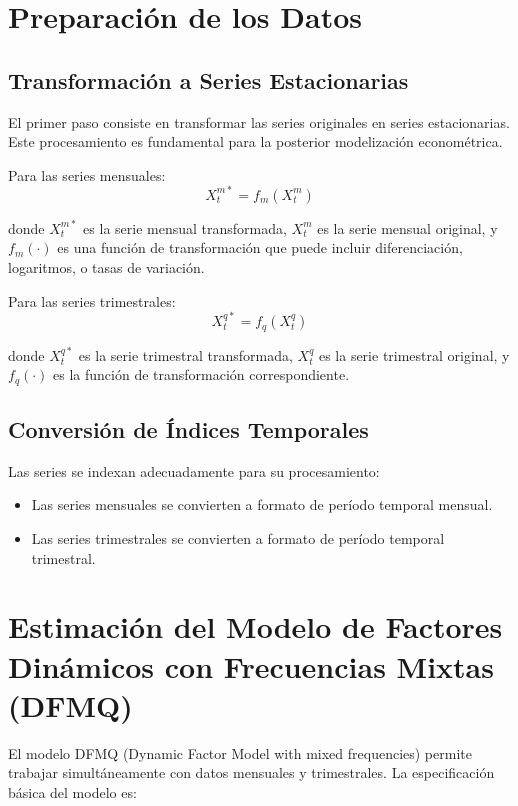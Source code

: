 \documentclass[12pt,a4paper]{article}
\begin{document}
\section{Preparación de los Datos}

\subsection{Transformación a Series Estacionarias}

El primer paso consiste en transformar las series originales en series estacionarias. Este procesamiento es fundamental para la posterior modelización econométrica.

Para las series mensuales:
\begin{equation}
X_{t}^{m*} = f_m(X_t^m)
\end{equation}

donde $X_{t}^{m*}$ es la serie mensual transformada, $X_t^m$ es la serie mensual original, y $f_m(\cdot)$ es una función de transformación que puede incluir diferenciación, logaritmos, o tasas de variación.

Para las series trimestrales:
\begin{equation}
X_{t}^{q*} = f_q(X_t^q)
\end{equation}

donde $X_{t}^{q*}$ es la serie trimestral transformada, $X_t^q$ es la serie trimestral original, y $f_q(\cdot)$ es la función de transformación correspondiente.

\subsection{Conversión de Índices Temporales}

Las series se indexan adecuadamente para su procesamiento:
\begin{itemize}
    \item Las series mensuales se convierten a formato de período temporal mensual.
    \item Las series trimestrales se convierten a formato de período temporal trimestral.
\end{itemize}

\section{Estimación del Modelo de Factores Dinámicos con Frecuencias Mixtas (DFMQ)}

El modelo DFMQ (Dynamic Factor Model with mixed frequencies) permite trabajar simultáneamente con datos mensuales y trimestrales. La especificación básica del modelo es:
\end{document}
